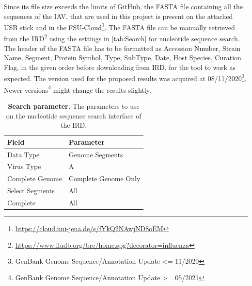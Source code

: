 Since its file size exceeds the limits of GitHub, the FASTA file containing all the sequences of the \gls{IAV}, that are used in this project is present on the attached USB stick and in the FSU-Cloud\footnote{\url{https://cloud.uni-jena.de/s/fYkQ2NAwjND8oEM}}. The FASTA file can be manually retrieved from the \gls{IRD}\footnote{\url{https://www.fludb.org/brc/home.spg?decorator=influenza}} using the settings in \autoref{tab:Search} for nucleotide sequence search. The header of the FASTA file has to be formatted as Accession Number, Strain Name, Segment, Protein Symbol, Type, SubType, Date, Host Species, Curation Flag, in the given order before downloading from \gls{IRD}, for the tool to work as expected. The version used for the proposed results was acquired at 08/11/2020\footnote{GenBank Genome Sequence/Annotation Update <= 11/2020}. Newer versions\footnote{GenBank Genome Sequence/Annotation Update >= 05/2021} might change the results slightly.

\begin{table}[!hbt]
    \footnotesize
    \centering
    \caption[Search parameter]{\textbf{Search parameter.} The parameters to use on the nucleotide sequence search interface of the \gls{IRD}.}
    \label{tab:Search}
    \begin{tabular*}{0.5\textwidth}{@{\extracolsep{\fill}\hspace{6pt}}ll}
        \toprule
        \textbf{Field} & \textbf{Parameter}\\
        \midrule
        Data Type & Genome Segments\\
        Virus Type & A\\
        Complete Genome & Complete Genome Only\\
        Select Segments & All\\
        Complete & All\\
        \bottomrule
    \end{tabular*}
\end{table}

